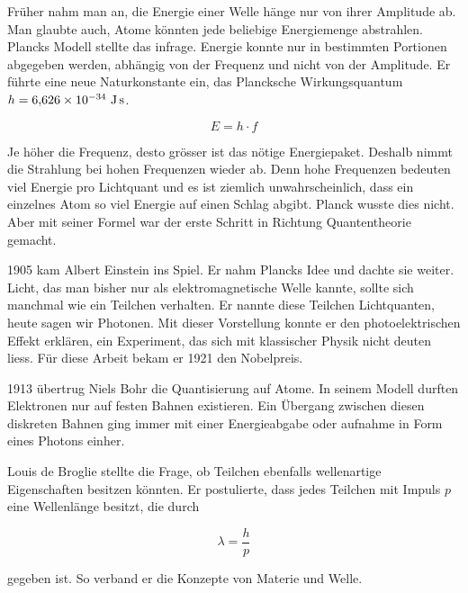 	



	
	
	
	Früher nahm man an, die Energie einer Welle hänge nur von ihrer Amplitude ab. 
	Man glaubte auch, Atome könnten jede beliebige Energiemenge abstrahlen. Plancks Modell stellte das infrage. 
	Energie konnte nur in bestimmten Portionen abgegeben werden, abhängig von der Frequenz und nicht von der Amplitude.
    Er führte eine neue Naturkonstante ein, das Plancksche Wirkungsquantum $h = 6{,}626 \times 10^{-34} \ \text{J\,s}$. 
	
	
	\begin{equation}
		E = h \cdot f
	\end{equation}
	 
	 
	Je höher die Frequenz, desto grösser ist das nötige Energiepaket. 
	Deshalb nimmt die Strahlung bei hohen Frequenzen wieder ab. Denn hohe Frequenzen bedeuten viel Energie pro Lichtquant und es ist ziemlich unwahrscheinlich, dass ein einzelnes Atom so viel Energie auf einen Schlag abgibt. 
	Planck wusste dies nicht. 
	Aber mit seiner Formel war der erste Schritt in Richtung Quantentheorie gemacht.
	
	
	
	1905 kam Albert Einstein ins Spiel. 
	Er nahm Plancks Idee und dachte sie weiter. 
	Licht, das man bisher nur als elektromagnetische Welle kannte, sollte sich manchmal wie ein Teilchen verhalten.
	Er nannte diese Teilchen Lichtquanten, heute sagen wir Photonen. 
	Mit dieser Vorstellung konnte er den photoelektrischen Effekt erklären, ein Experiment, das sich mit klassischer Physik nicht deuten liess. 
	Für diese Arbeit bekam er 1921 den Nobelpreis.
	 
	
	1913 übertrug Niels Bohr die Quantisierung auf Atome. 
	In seinem Modell durften Elektronen nur auf festen Bahnen existieren. 
	Ein Übergang zwischen diesen diskreten Bahnen ging immer mit einer Energieabgabe oder aufnahme in Form eines Photons einher. 

	
	Louis de Broglie stellte die Frage, ob Teilchen ebenfalls wellenartige Eigenschaften besitzen könnten. 
	Er postulierte, dass jedes Teilchen mit Impuls $p$ eine Wellenlänge besitzt, die durch
	
	
	\begin{equation}
		\lambda = \frac{h}{p}
	\end{equation}
	
	
	gegeben ist. So verband er die Konzepte von Materie und Welle.
	
